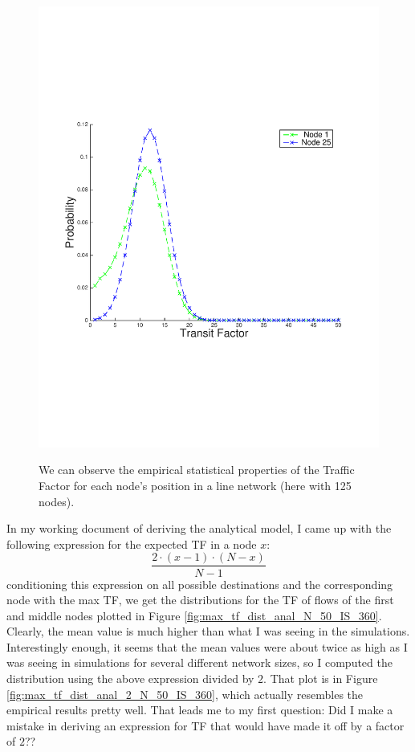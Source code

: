 \documentclass[conference]{IEEEtran}
\begin{document}
\begin{figure}
\begin{centering}
{    		\includegraphics[scale=0.4, clip=true, trim=15mm 65mm 20mm 65mm]{figs_exp_vs_anal/num_nodes_50/image_size_360/timeliness_165/line_net/anal_flow_TF_pdf_2.pdf}
		\label{fig:max_tf_dist_anal_2_N_50_IS_360}
		}
	\caption{We can observe the empirical statistical properties of the Traffic Factor for each node's position in a line network (here with 125 nodes).}
	\label{fig:TF_empirical_stats_each_node_line_net}
\end{centering}
\end{figure}

In my working document of deriving the analytical model, I came up with the following expression for the expected TF in a node $x$:
\begin{equation}
	\frac{2 \cdot (x-1) \cdot (N-x)}{N-1}
\end{equation}
conditioning this expression on all possible destinations and the corresponding node with the max TF, we get the distributions for the TF of flows of the first and middle nodes plotted in Figure \ref{fig:max_tf_dist_anal_N_50_IS_360}.  Clearly, the mean value is much higher than what I was seeing in the simulations.  Interestingly enough, it seems that the mean values were about twice as high as I was seeing in simulations for several different network sizes, so I computed the distribution using the above expression divided by $2$.  That plot is in Figure \ref{fig:max_tf_dist_anal_2_N_50_IS_360}, which actually resembles the empirical results pretty well.  That leads me to my first question: Did I make a mistake in deriving an expression for TF that would have made it off by a factor of $2$?? 
\end{document}
